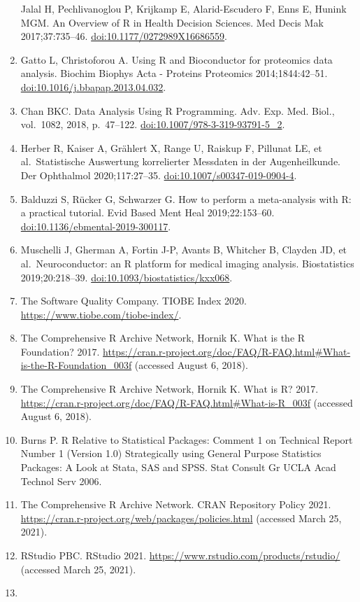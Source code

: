 \documentclass[
]{book}
\begin{document}
\begin{enumerate}
  Jalal H, Pechlivanoglou P, Krijkamp E, Alarid-Escudero F, Enns E, Hunink MGM. An Overview of R in Health Decision Sciences. Med Decis Mak 2017;37:735--46. \url{doi:10.1177/0272989X16686559}.
\item
  Gatto L, Christoforou A. Using R and Bioconductor for proteomics data analysis. Biochim Biophys Acta - Proteins Proteomics 2014;1844:42--51. \url{doi:10.1016/j.bbapap.2013.04.032}.
\item
  Chan BKC. Data Analysis Using R Programming. Adv. Exp. Med. Biol., vol.~1082, 2018, p.~47--122. \url{doi:10.1007/978-3-319-93791-5_2}.
\item
  Herber R, Kaiser A, Grählert X, Range U, Raiskup F, Pillunat LE, et al.~Statistische Auswertung korrelierter Messdaten in der Augenheilkunde. Der Ophthalmol 2020;117:27--35. \url{doi:10.1007/s00347-019-0904-4}.
\item
  Balduzzi S, Rücker G, Schwarzer G. How to perform a meta-analysis with R: a practical tutorial. Evid Based Ment Heal 2019;22:153--60. \url{doi:10.1136/ebmental-2019-300117}.
\item
  Muschelli J, Gherman A, Fortin J-P, Avants B, Whitcher B, Clayden JD, et al.~Neuroconductor: an R platform for medical imaging analysis. Biostatistics 2019;20:218--39. \url{doi:10.1093/biostatistics/kxx068}.
\item
  The Software Quality Company. TIOBE Index 2020. \url{https://www.tiobe.com/tiobe-index/}.
\item
  The Comprehensive R Archive Network, Hornik K. What is the R Foundation? 2017. \url{https://cran.r-project.org/doc/FAQ/R-FAQ.html\#What-is-the-R-Foundation_003f} (accessed August 6, 2018).
\item
  The Comprehensive R Archive Network, Hornik K. What is R? 2017. \url{https://cran.r-project.org/doc/FAQ/R-FAQ.html\#What-is-R_003f} (accessed August 6, 2018).
\item
  Burns P. R Relative to Statistical Packages: Comment 1 on Technical Report Number 1 (Version 1.0) Strategically using General Purpose Statistics Packages: A Look at Stata, SAS and SPSS. Stat Consult Gr UCLA Acad Technol Serv 2006.
\item
  The Comprehensive R Archive Network. CRAN Repository Policy 2021. \url{https://cran.r-project.org/web/packages/policies.html} (accessed March 25, 2021).
\item
  RStudio PBC. RStudio 2021. \url{https://www.rstudio.com/products/rstudio/} (accessed March 25, 2021).
\item

\end{enumerate}
\end{document}
